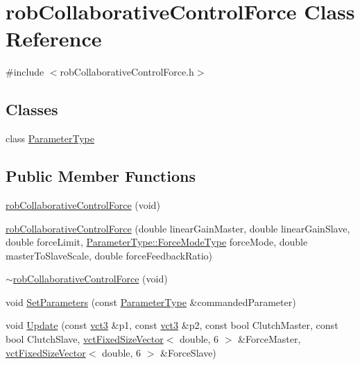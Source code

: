 \hypertarget{classrob_collaborative_control_force}{}\section{rob\+Collaborative\+Control\+Force Class Reference}
\label{classrob_collaborative_control_force}


{\ttfamily \#include $<$rob\+Collaborative\+Control\+Force.\+h$>$}

\subsection*{Classes}
\begin{DoxyCompactItemize}
\item 
class \hyperlink{classrob_collaborative_control_force_1_1_parameter_type}{Parameter\+Type}
\end{DoxyCompactItemize}
\subsection*{Public Member Functions}
\begin{DoxyCompactItemize}
\item 
\hyperlink{classrob_collaborative_control_force_a1e7ed34f7df30aed3771083cdce02a95}{rob\+Collaborative\+Control\+Force} (void)
\item 
\hyperlink{classrob_collaborative_control_force_ae09387a96e509acf75adda78f266fdc7}{rob\+Collaborative\+Control\+Force} (double linear\+Gain\+Master, double linear\+Gain\+Slave, double force\+Limit, \hyperlink{classrob_collaborative_control_force_1_1_parameter_type_ab4ec71e97ffffd412993ea4f307e9acf}{Parameter\+Type\+::\+Force\+Mode\+Type} force\+Mode, double master\+To\+Slave\+Scale, double force\+Feedback\+Ratio)
\item 
\hyperlink{classrob_collaborative_control_force_add898dc0e9b783f0659b3c1a455d7b16}{$\sim$rob\+Collaborative\+Control\+Force} (void)
\item 
void \hyperlink{classrob_collaborative_control_force_a8b6ee9968a8328b0de3588b9bc0143fc}{Set\+Parameters} (const \hyperlink{classrob_collaborative_control_force_1_1_parameter_type}{Parameter\+Type} \&commanded\+Parameter)
\item 
void \hyperlink{classrob_collaborative_control_force_a31bbb39e19d2fec0bebf83fd256d5394}{Update} (const \hyperlink{vct_fixed_size_vector_types_8h_a3af82acdbf4eeb73c551909240b106ea}{vct3} \&p1, const \hyperlink{vct_fixed_size_vector_types_8h_a3af82acdbf4eeb73c551909240b106ea}{vct3} \&p2, const bool Clutch\+Master, const bool Clutch\+Slave, \hyperlink{classvct_fixed_size_vector}{vct\+Fixed\+Size\+Vector}$<$ double, 6 $>$ \&Force\+Master, \hyperlink{classvct_fixed_size_vector}{vct\+Fixed\+Size\+Vector}$<$ double, 6 $>$ \&Force\+Slave)
\end{DoxyCompactItemize}
